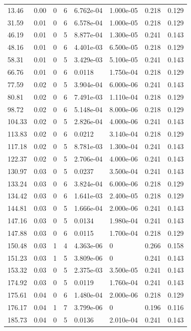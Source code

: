 \documentclass[preview]{standalone}
\begin{document}
{{\begin{tabular}{L{1.2cm}C{1.2cm} C{0.3cm}C{0.5cm} C{1.4cm}C{1.4cm} C{1.4cm}C{1.4cm}}
  13.46  &  0.00  & 0     &  6 &  6.762e-04  & 1.000e-05  & 0.218 &  0.129   \\ 
  31.59  &  0.01  & 0     &  6 &  6.578e-04  & 1.000e-05  & 0.218 &  0.129   \\ 
  46.19  &  0.01  & 0     &  5 &  8.877e-04  & 1.300e-05  & 0.241 &  0.143   \\ 
  48.16  &  0.01  & 0     &  6 &  4.401e-03  & 6.500e-05  & 0.218 &  0.129   \\ 
  58.31  &  0.01  & 0     &  5 &  3.429e-03  & 5.100e-05  & 0.241 &  0.143   \\ 
  66.76  &  0.01  & 0     &  6 &  0.0118  & 1.750e-04  & 0.218 &  0.129   \\ 
  77.59  &  0.02  & 0     &  5 &  3.904e-04  & 6.000e-06  & 0.241 &  0.143   \\ 
  80.81  &  0.02  & 0     &  6 &  7.491e-03  & 1.110e-04  & 0.218 &  0.129   \\ 
  98.72  &  0.02  & 0     &  6 &  5.148e-04  & 8.000e-06  & 0.218 &  0.129   \\ 
  104.33  &  0.02  & 0     &  5 &  2.826e-04  & 4.000e-06  & 0.241 &  0.143   \\ 
  113.83  &  0.02  & 0     &  6 &  0.0212  & 3.140e-04  & 0.218 &  0.129   \\ 
  117.18  &  0.02  & 0     &  5 &  8.781e-03  & 1.300e-04  & 0.241 &  0.143   \\ 
  122.37  &  0.02  & 0     &  5 &  2.706e-04  & 4.000e-06  & 0.241 &  0.143   \\ 
  130.97  &  0.03  & 0     &  5 &  0.0237  & 3.500e-04  & 0.241 &  0.143   \\ 
  133.24  &  0.03  & 0     &  6 &  3.824e-04  & 6.000e-06  & 0.218 &  0.129   \\ 
  134.42  &  0.03  & 0     &  6 &  1.641e-03  & 2.400e-05  & 0.218 &  0.129   \\ 
  144.81  &  0.03  & 0     &  5 &  1.666e-04  & 2.000e-06  & 0.241 &  0.143   \\ 
  147.16  &  0.03  & 0     &  5 &  0.0134  & 1.980e-04  & 0.241 &  0.143   \\ 
  147.88  &  0.03  & 0     &  6 &  0.0115  & 1.700e-04  & 0.218 &  0.129   \\ 
  150.48  &  0.03  & 1     &  4 &  4.363e-06  & 0  & 0.266 &  0.158   \\ 
  151.23  &  0.03  & 1     &  5 &  3.809e-06  & 0  & 0.241 &  0.143   \\ 
  153.32  &  0.03  & 0     &  5 &  2.375e-03  & 3.500e-05  & 0.241 &  0.143   \\ 
  174.92  &  0.03  & 0     &  5 &  0.0119  & 1.760e-04  & 0.241 &  0.143   \\ 
  175.61  &  0.04  & 0     &  6 &  1.480e-04  & 2.000e-06  & 0.218 &  0.129   \\ 
  176.17  &  0.04  & 1     &  7 &  3.799e-06  & 0  & 0.196 &  0.116   \\ 
  185.73  &  0.04  & 0     &  5 &  0.0136  & 2.010e-04  & 0.241 &  0.143   \\ 
\hline 
\end{tabular} 

}}
\end{document}

